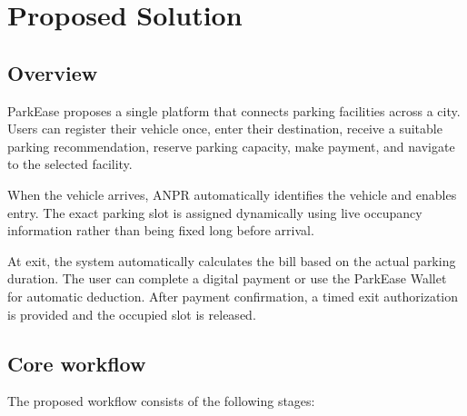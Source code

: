 \documentclass[12pt,a4paper]{article}
\begin{document}

\newpage
\section{Proposed Solution}

\subsection{Overview}

ParkEase proposes a single platform that connects parking facilities across a city. Users can register their vehicle once, enter their destination, receive a suitable parking recommendation, reserve parking capacity, make payment, and navigate to the selected facility.

When the vehicle arrives, ANPR automatically identifies the vehicle and enables entry. The exact parking slot is assigned dynamically using live occupancy information rather than being fixed long before arrival.

At exit, the system automatically calculates the bill based on the actual parking duration. The user can complete a digital payment or use the ParkEase Wallet for automatic deduction. After payment confirmation, a timed exit authorization is provided and the occupied slot is released.

\subsection{Core workflow}

The proposed workflow consists of the following stages:
\end{document}
